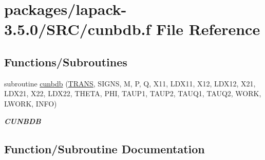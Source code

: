 \hypertarget{cunbdb_8f}{}\section{packages/lapack-\/3.5.0/\+S\+R\+C/cunbdb.f File Reference}
\label{cunbdb_8f}
\subsection*{Functions/\+Subroutines}
\begin{DoxyCompactItemize}
\item 
subroutine \hyperlink{cunbdb_8f_a9cc2387e6af68f09cd2cae98f77330da}{cunbdb} (\hyperlink{superlu__enum__consts_8h_a0c4e17b2d5cea33f9991ccc6a6678d62a1f61e3015bfe0f0c2c3fda4c5a0cdf58}{T\+R\+A\+N\+S}, S\+I\+G\+N\+S, M, P, Q, X11, L\+D\+X11, X12, L\+D\+X12, X21, L\+D\+X21, X22, L\+D\+X22, T\+H\+E\+T\+A, P\+H\+I, T\+A\+U\+P1, T\+A\+U\+P2, T\+A\+U\+Q1, T\+A\+U\+Q2, W\+O\+R\+K, L\+W\+O\+R\+K, I\+N\+F\+O)
\begin{DoxyCompactList}\small\item\em {\bfseries C\+U\+N\+B\+D\+B} \end{DoxyCompactList}\end{DoxyCompactItemize}


\subsection{Function/\+Subroutine Documentation}
\hypertarget{cunbdb_8f_a9cc2387e6af68f09cd2cae98f77330da}{}
